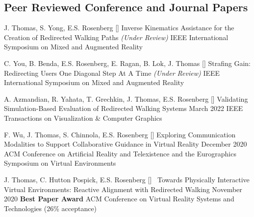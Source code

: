 

\begin{cventries}
  \vspace{-.75cm}
  \subsection*{Peer Reviewed Conference and Journal Papers}
  \cventry
    {J. Thomas, S. Yong, E.S. Rosenberg} %
    {[\thenpubs] Inverse Kinematics Assistance for the Creation of Redirected Walking Paths \textit{(Under Review)}} %
    {} %
    {} %
    {IEEE International Symposium on Mixed and Augmented Reality}%
  
  \cventry
    {C. You, B. Benda, E.S. Rosenberg, E. Ragan, B. Lok, J. Thomas} %
    {[\thenpubs] Strafing Gain: Redirecting Users One Diagonal Step At A Time \textit{(Under Review)}} %
    {} %
    {} %
    {IEEE International Symposium on Mixed and Augmented Reality}%

  \cventry
    {A. Azmandian, R. Yahata, T. Grechkin, J. Thomas, E.S. Rosenberg} %
    {[\thenpubs] Validating Simulation-Based Evaluation of Redirected Walking Systems} %
    {March 2022} %
    {} %
    {IEEE Transactions on Visualization \& Computer Graphics}%
    
  \cventry
    {F. Wu, J. Thomas, S. Chinnola, E.S. Rosenberg} %
    {[\thenpubs] Exploring Communication Modalities to Support Collaborative Guidance in Virtual Reality} %
    {December 2020} %
    {} %
    {ACM Conference on Artificial Reality and Telexistence and the Eurographics Symposium on Virtual Environments}%
    
  \cventry
    {J. Thomas, C. Hutton Pospick, E.S. Rosenberg} %
    {[\thenpubs]\ \textcolor{awesome}{\faTrophy} Towards Physically Interactive Virtual Environments: Reactive Alignment with Redirected Walking} %
    {November 2020} %
    {\textbf{Best Paper Award}} %
    {ACM Conference on Virtual Reality Systems and Technologies (26\% acceptance)}%
    

\end{cventries}

